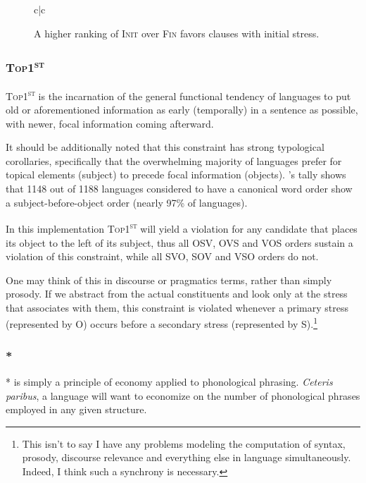 \documentclass{article}
\newcommand{\topf}{\textsc{Top1\textsuperscript{st}}}
\newcommand{\nophi}{\textsc{*\textphi}}
\newcommand{\finphi}{\textsc{Fin\textphi}}
\newcommand{\initphi}{\textsc{Init\textphi}}
\begin{document}
\begin{figure}
\begin{center}
\begin{tableau}{c|c}
		\const{\initphi}	\const{\finphi}
	\cand[\Optimal]{[OV]} \vio{}	\vio{*}
	\cand{[VO]} \vio{*!}	\vio{}
\end{tableau}
\end{center}
	\caption{A higher ranking of {\initphi} over {\finphi} favors clauses with initial stress.}
\end{figure}

\subsubsection{\topf}

{\topf} is the incarnation of the general functional tendency of languages to put old or aforementioned information as early (temporally) in a sentence as possible, with newer, focal information coming afterward.

It should be additionally noted that this constraint has strong typological corollaries, specifically that the overwhelming majority of languages prefer for topical elements (subject) to precede focal information (objects).
\textcite{dryer13}'s tally shows that 1148 out of 1188 languages considered to have a canonical word order show a subject-before-object order (nearly 97\% of languages).

In this implementation {\topf} will yield a violation for any candidate that places its object to the left of its subject, thus all OSV, OVS and VOS orders sustain a violation of this constraint, while all SVO, SOV and VSO orders do not.

One may think of this in discourse or pragmatics terms, rather than simply prosody.
If we abstract from the actual constituents and look only at the stress that associates with them, this constraint is violated whenever a primary stress (represented by O) occurs before a secondary stress (represented by S).\footnote{This isn't to say I have any problems modeling the computation of syntax, prosody, discourse relevance and everything else in language simultaneously. Indeed, I think such a synchrony is necessary.}

\subsubsection{\nophi}

{\nophi} is simply a principle of economy applied to phonological phrasing.
\textit{Ceteris paribus}, a language will want to economize on the number of phonological phrases employed in any given structure.
\end{document}
